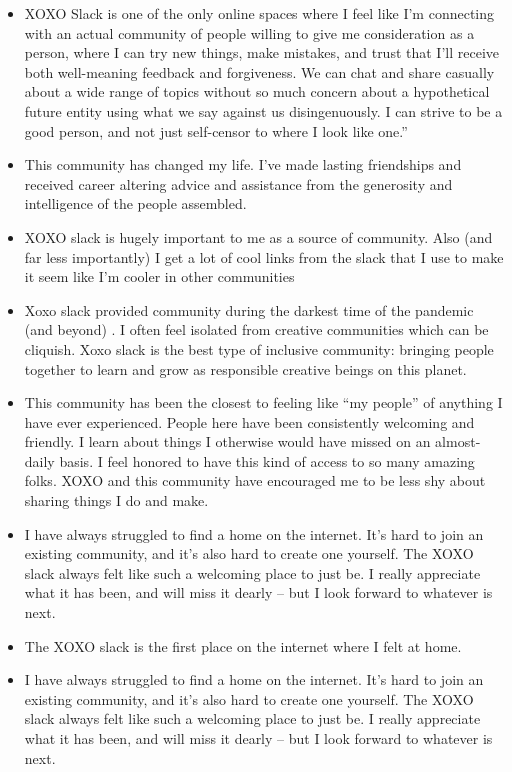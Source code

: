 \documentclass[
]{book}
\providecommand{\tightlist}{%
  \setlength{\itemsep}{0pt}\setlength{\parskip}{0pt}}
\begin{document}
\begin{itemize}
\tightlist
\item
  XOXO Slack is one of the only online spaces where I feel like I'm connecting with an actual community of people willing to give me consideration as a person, where I can try new things, make mistakes, and trust that I'll receive both well-meaning feedback and forgiveness. We can chat and share casually about a wide range of topics without so much concern about a hypothetical future entity using what we say against us disingenuously. I can strive to be a good person, and not just self-censor to where I look like one.''
\item
  This community has changed my life. I've made lasting friendships and received career altering advice and assistance from the generosity and intelligence of the people assembled.
\item
  XOXO slack is hugely important to me as a source of community. Also (and far less importantly) I get a lot of cool links from the slack that I use to make it seem like I'm cooler in other communities
\item
  Xoxo slack provided community during the darkest time of the pandemic (and beyond) . I often feel isolated from creative communities which can be cliquish. Xoxo slack is the best type of inclusive community: bringing people together to learn and grow as responsible creative beings on this planet.
\item
  This community has been the closest to feeling like ``my people'' of anything I have ever experienced. People here have been consistently welcoming and friendly. I learn about things I otherwise would have missed on an almost-daily basis. I feel honored to have this kind of access to so many amazing folks. XOXO and this community have encouraged me to be less shy about sharing things I do and make.
\item
  I have always struggled to find a home on the internet. It's hard to join an existing community, and it's also hard to create one yourself. The XOXO slack always felt like such a welcoming place to just be. I really appreciate what it has been, and will miss it dearly -- but I look forward to whatever is next.
\item
  The XOXO slack is the first place on the internet where I felt at home.
\item
  I have always struggled to find a home on the internet. It's hard to join an existing community, and it's also hard to create one yourself. The XOXO slack always felt like such a welcoming place to just be. I really appreciate what it has been, and will miss it dearly -- but I look forward to whatever is next.
\end{itemize}
\end{document}
